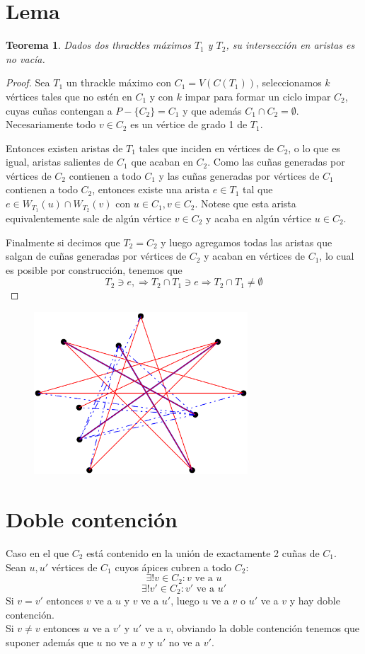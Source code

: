 \documentclass[11pt,helvetica,letter]{article}
\newtheorem{theorem}{Teorema}
\begin{document}
 \section{ Lema }
 \begin{theorem}
   Dados dos thrackles máximos $T_1$ y $T_2$, su intersección en aristas es no vacía.
 \end{theorem}
 \begin{proof}
 Sea $T_1$ un thrackle máximo con $C_1=V(C(T_1))$, seleccionamos $k$ vértices tales que no estén en $C_1$ y con $k$ impar
 para formar un ciclo impar $C_2$, cuyas cuñas contengan a $P-\{C_2\}= C_1$ y que además $C_1 \cap C_2 = \emptyset$. Necesariamente
 todo $v \in C_2$ es un vértice de grado 1 de $T_1$.

 Entonces existen aristas de $T_1$ tales que inciden en vértices de $C_2$, o lo que es igual,
 aristas salientes de $C_1$ que acaban en $C_2$. Como las cuñas generadas por vértices de $C_2$ contienen a todo $C_1$ y las
 cuñas generadas por vértices de $C_1$ contienen a todo $C_2$, entonces existe una arista $e\in T_1$
 tal que $e\in W_{T_1}(u) \cap W_{T_2}(v)$ con $u\in C_1, v\in C_2$. Notese que esta arista equivalentemente sale de algún vértice
 $v \in C_2$ y acaba en algún vértice $u \in C_2$.

 Finalmente si decimos que $T_2 = C_2$ y luego agregamos todas las aristas que salgan de cuñas generadas por vértices de $C_2$
 y acaban en vértices de $C_1$, lo cual es posible por construcción, tenemos que \[T_2 \ni  e, \Rightarrow T_2 \cap T_1 \ni e \Rightarrow T_2 \cap T_1 \neq \emptyset\]
\end{proof}

\begin{figure}[h]
  \centering
  \includegraphics[width=8cm]{lemathrackles}

\end{figure}
\newpage
\section{Doble contención}
Caso en el que $C_2$ está contenido en la unión de exactamente 2 cuñas de $C_1$.\\
Sean $u,u'$ vértices de $C_1$ cuyos ápices cubren a todo $C_2$:
\[ \exists! v\in C_2: v \text{ ve a } u \]
\[ \exists! v'\in C_2: v' \text{ ve a } u' \]
Si $v=v'$ entonces $v$ ve a $u$ y $v$ ve a $u'$, luego $u$ ve a $v$ o $u'$ ve a $v$ y hay doble contención.\\
Si $v\neq v$ entonces $u$ ve a $v'$ y $u'$ ve a $v$, obviando la doble contención tenemos que suponer además que
$u$ no ve a $v$ y $u'$ no ve a $v'$.
\end{document}
